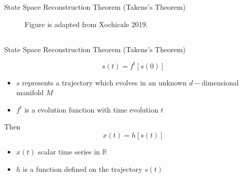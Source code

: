 {{{\begin{frame}{State Space Reconstruction Theorem (Takens's Theorem)}
    \begin{figure}
	{Figure is adapted from Xochicale 2019.} 
   \end{figure}
	
\end{frame}
}






\subsection{}
{

\begin{frame}{State Space Reconstruction Theorem (Takens's Theorem)}

\LARGE
\begin{equation*}\label{eq:measurement}
	s(t)= f^{t}[ s(0) ]
\end{equation*}
\normalsize
\begin{itemize}
\item $s$ represents a trajectory which evolves in an unknown $d-$dimensional manifold $M$
\item $f^t$ is a evolution function with time evolution $t$
\end{itemize}
Then 
\LARGE
\begin{equation*}\label{eq:measurement}
	x(t)=h[s(t)]
\end{equation*}
\normalsize
\begin{itemize}
\item $x(t)$ scalar time series in $\mathbb{R}$ 
\item $h$ is a function defined on the trajectory $s(t)$
\end{itemize}



\end{frame}}}}
